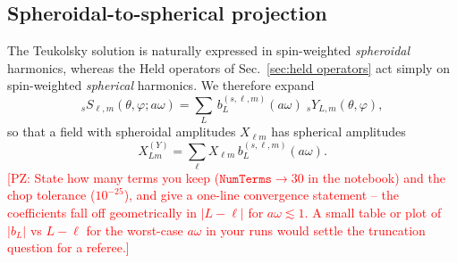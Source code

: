 \documentclass[preprint,aps,nofootinbib,a4paper,superscriptaddress,longbibliography,amsfonts, amssymb,amsmath,titlepage]{revtex4-1}
\numberwithin{equation}{section} %
\newcommand{\PZ}[1]{\textcolor{red}{\textsf{[PZ: #1]}}}
\newcommand{\emm}{m}
\def\l{\ensuremath{\ell}}
\newcommand{\sYY}[3]{{}_{#1}Y_{#2,#3}}
\newcommand{\sSS}[3]{{}_{#1}S_{#2,#3}}
\begin{document}
\subsection{Spheroidal-to-spherical projection}
\label{sec:spheroidal}
The Teukolsky solution is naturally expressed in spin-weighted
\emph{spheroidal} harmonics, whereas the Held operators of
Sec.~\ref{sec:held operators} act simply on spin-weighted \emph{spherical}
harmonics.  We therefore expand
\begin{equation}\label{eq:spheroidal to spherical}
\sSS{s}{\l}{\emm}(\theta,\varphi;a\omega)
=
\sum_{L}\,b^{(s,\l,\emm)}_{L}(a\omega)\;\sYY{s}{L}{\emm}(\theta,\varphi),
\end{equation}
so that a field with spheroidal amplitudes $X_{\l\emm}$ has spherical
amplitudes
\begin{equation}\label{eq:S to Y amplitudes}
X^{(Y)}_{L\emm} = \sum_{\l} X_{\l\emm}\, b^{(s,\l,\emm)}_{L}(a\omega).
\end{equation}
\PZ{State how many terms you keep ($\texttt{NumTerms}\to30$ in the notebook)
and the chop tolerance ($10^{-25}$), and give a one-line convergence
statement -- the coefficients fall off geometrically in $|L-\l|$ for
$a\omega\lesssim1$.  A small table or plot of $|b_L|$ vs $L-\l$ for the
worst-case $a\omega$ in your runs would settle the truncation question
for a referee.}
\end{document}
